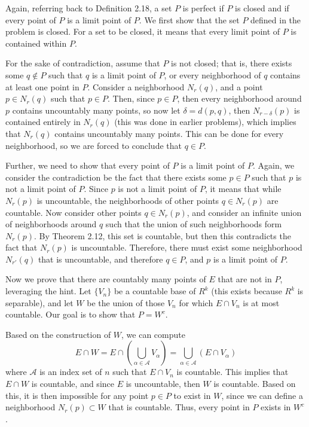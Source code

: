 \documentclass[10pt]{article}
\begin{document}
	\begin{solution}
		Again, referring back to Definition 2.18, a set \( P \) is perfect if \( P \) is closed 
		and if every point of  \( P \) is a limit point of \( P \). We first show that the set \( P \) defined 
		in the problem is closed. For a set to be closed, it means that every limit point of \( P \) is 
		contained within \( P \). 

		For the sake of contradiction, assume that \( P \) is not closed; that is, there exists some \( q \not \in P \) 
		such that \( q \) is a limit point of \( P \), or every neighborhood of \( q \) contains at least one 
		point in \( P \). Consider a neighborhood \( N_r(q) \), and a point \( p \in N_r(q) \) such that 
		\( p \in P \). Then, since \( p \in P \), then every neighborhood around \( p \) contains uncountably 
		many points, so now let \( \delta = d(p, q) \), then \( N_{r - \delta}(p) \) is contained entirely in 
		\( N_r(q) \) (this was done in earlier problems), which implies that \( N_r(q) \) contains 
		uncountably many points. This can be done for every neighborhood, so we are forced to conclude that 
		\( q \in P \). 

		Further, we need to show that every point of \( P \) is a limit point of \( P \). Again, we consider 
		the contradiction be the fact that there exists some \( p \in P \) such that \( p \) is not a limit 
		point of \( P \). Since \( p \) is not a limit point of \( P \), it means that while \( N_r(p) \) is 
		uncountable, the neighborhoods of other points \( q \in N_r(p) \) are countable.      
		Now consider other points \( q \in N_{r}(p) \), and consider an infinite union of neighborhoods around \( q \)
		such that the union of such neighborhoods form \( N_r(p) \). By Theorem 2.12, this set is 
		countable, but then this contradicts the fact that \( N_r(p)  \) is uncountable. Therefore, there must exist 
		some neighborhood \( N_{r'}(q) \) that is uncountable, and therefore \( q \in P \), and \( p \) is 
		a limit point of \( P \). 

		Now we prove that there are countably many points of \( E \) that are not in \( P \), leveraging the hint. Let 
		\( \{V_n\}  \) be a countable base of \( R^{k} \) (this exists because \( R^{k} \) is separable), 
		and let \( W \) be the union of those \( V_n \) for which 
		\( E \cap V_n \) is at most countable. Our goal is to show that \( P = W^{c} \). 

		Based on the construction of \( W \), we can compute 
		\[
			E \cap W = E\cap \left(\bigcup_{\alpha \in \mathcal{A}} V_{\alpha}\right) = 
			\bigcup_{\alpha \in \mathcal{A}} \left( E \cap V_{\alpha} \right) 
		\]
		where \( \mathcal{A} \) is an index set of  \( n \) such that \( E \cap V_n \) is countable. This 
		implies that \( E \cap W \) is countable, and since \( E \) is uncountable, then \( W \) is countable. 
		Based on this, it is then impossible for any point \( p \in P \) to exist in \( W \), since we can 
		define a neighborhood \( N_r(p) \subset W \) that is countable. Thus, every point in \( P \) exists
		in \( W^{c} \).   
	\end{solution}
\end{document}

